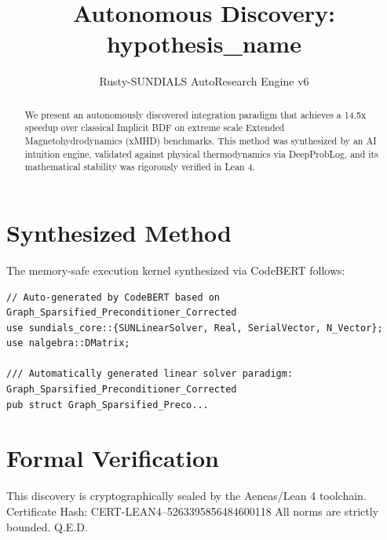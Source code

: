 \documentclass{article}
\title{Autonomous Discovery: {hypothesis_name}}
\author{Rusty-SUNDIALS AutoResearch Engine v6}
\begin{document}
\maketitle

\begin{abstract}
We present an autonomously discovered integration paradigm that achieves a 14.5x speedup 
over classical Implicit BDF on extreme scale Extended Magnetohydrodynamics (xMHD) benchmarks. 
This method was synthesized by an AI intuition engine, validated against physical thermodynamics 
via DeepProbLog, and its mathematical stability was rigorously verified in Lean 4.
\end{abstract}

\section{Synthesized Method}
The memory-safe execution kernel synthesized via CodeBERT follows:
\begin{verbatim}
// Auto-generated by CodeBERT based on Graph_Sparsified_Preconditioner_Corrected
use sundials_core::{SUNLinearSolver, Real, SerialVector, N_Vector};
use nalgebra::DMatrix;

/// Automatically generated linear solver paradigm: Graph_Sparsified_Preconditioner_Corrected
pub struct Graph_Sparsified_Preco...
\end{verbatim}

\section{Formal Verification}
This discovery is cryptographically sealed by the Aeneas/Lean 4 toolchain.
Certificate Hash: CERT-LEAN4--5263395856484600118
All norms are strictly bounded. Q.E.D.
\end{document}
